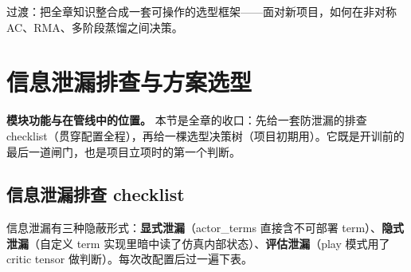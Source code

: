 过渡：把全章知识整合成一套可操作的选型框架——面对新项目，如何在非对称 AC、RMA、多阶段蒸馏之间决策。

\section{信息泄漏排查与方案选型}
\label{sec:rlmc-priv-decision}

\textbf{模块功能与在管线中的位置。} 本节是全章的收口：先给一套防泄漏的排查 checklist（贯穿配置全程），再给一棵选型决策树（项目初期用）。它既是开训前的最后一道闸门，也是项目立项时的第一个判断。

\subsection{信息泄漏排查 checklist}
\label{sec:rlmc-priv-leak}

信息泄漏有三种隐蔽形式：\textbf{显式泄漏}（actor\_terms 直接含不可部署 term）、\textbf{隐式泄漏}（自定义 term 实现里暗中读了仿真内部状态）、\textbf{评估泄漏}（play 模式用了 critic tensor 做判断）。每次改配置后过一遍下表。

